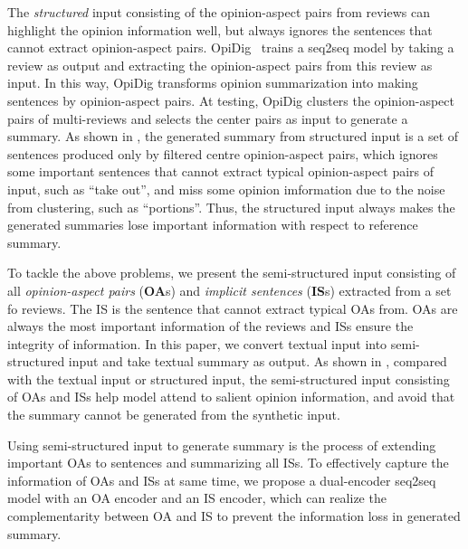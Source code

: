 The {\em structured} input consisting of the opinion-aspect pairs from reviews can highlight the opinion information well,
but always ignores the sentences that cannot extract opinion-aspect pairs.
OpiDig~\cite{OpiDig20} trains a seq2seq model by taking a review as output and extracting the opinion-aspect pairs from this review as input. 
In this way, OpiDig transforms opinion summarization into making sentences by
opinion-aspect pairs.
At testing, OpiDig clusters the opinion-aspect pairs 
of multi-reviews and selects the center pairs as input to 
generate a summary. 
As shown in , 
the generated summary from structured input 
is a set of sentences produced only by filtered centre opinion-aspect pairs, which ignores some important sentences that cannot extract typical opinion-aspect pairs of input, such as ``take out'', 
and miss some opinion imformation due to the noise from clustering,
such as ``portions''. 
Thus, the structured input always makes the generated summaries lose important information with respect to reference summary.

To tackle the above problems, we present the semi-structured input consisting of all {\em opinion-aspect pairs} (\textbf{OA}s) and {\em implicit sentences} (\textbf{IS}s) extracted from a set fo reviews.
The IS is the sentence that cannot extract typical OAs from. 
OAs are always the most important information of the reviews
and ISs ensure the integrity of information.
In this paper, 
we convert textual input into semi-structured input and take textual summary as output.
As shown in , 
compared with the textual input or structured input,
the semi-structured input consisting of OAs and ISs help model attend to salient opinion information,
and avoid that the summary cannot be generated from the synthetic input.

Using semi-structured input to generate summary is the process of extending important OAs to sentences and summarizing
all ISs.
To effectively capture the information of OAs and ISs at same time,
we propose a dual-encoder seq2seq model with an OA encoder and an IS encoder, which can realize the complementarity between OA and IS to prevent the information loss in generated summary. 


